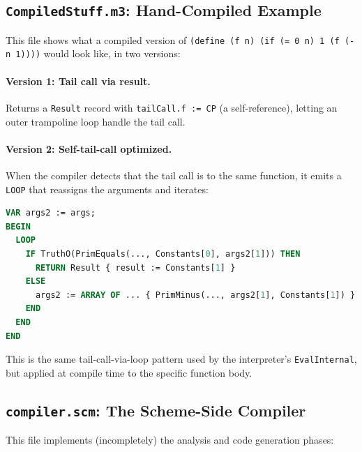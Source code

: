 \documentclass[12pt]{report}
\begin{document}
\subsection{\texttt{CompiledStuff.m3}: Hand-Compiled Example}

This file shows what a compiled version of
\texttt{(define (f n) (if (= 0 n) 1 (f (- n 1))))} would look
like, in two versions:

\paragraph{Version 1: Tail call via result.}
Returns a \texttt{Result} record with \texttt{tailCall.f := CP}
(a self-reference), letting an outer trampoline loop handle the
tail call.

\paragraph{Version 2: Self-tail-call optimized.}
When the compiler detects that the tail call is to the same function,
it emits a \texttt{LOOP} that reassigns the arguments and iterates:

\begin{lstlisting}[language=Modula3]
VAR args2 := args;
BEGIN
  LOOP
    IF TruthO(PrimEquals(..., Constants[0], args2[1])) THEN
      RETURN Result { result := Constants[1] }
    ELSE
      args2 := ARRAY OF ... { PrimMinus(..., args2[1], Constants[1]) }
    END
  END
END
\end{lstlisting}

This is the same tail-call-via-loop pattern used by the interpreter's
\texttt{EvalInternal}, but applied at compile time to the specific
function body.

\subsection{\texttt{compiler.scm}: The Scheme-Side Compiler}

This file implements (incompletely) the analysis and code generation
phases:
\end{document}
